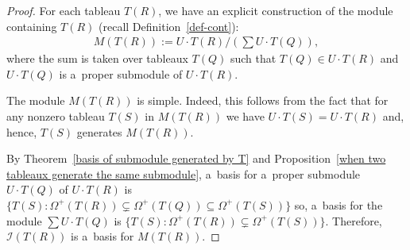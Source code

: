 \documentclass[11pt]{article}
\numberwithin{equation}{section}
\begin{document}
\begin{proof}

For each tableau $T(R)$, we have an explicit construction of the module containing $T(R)$ (recall
Def\/inition~\ref{def-cont}):
\begin{gather*}
M(T(R)):=U\cdot T(R)/\left(\sum U\cdot T(Q)\right),
\end{gather*}
where the sum is taken over tableaux $T(Q)$ such that $T(Q)\in U\cdot T(R)$ and $U\cdot T(Q)$ is a~proper submodule of
$U\cdot T(R)$.

The module $M(T(R))$ is simple.
Indeed, this follows from the fact that for any nonzero tableau $T(S)$ in $M(T(R))$ we have $U\cdot T(S)=U\cdot T(R)$
and, hence, $T(S)$ generates $M(T(R))$.

By Theorem~\ref{basis of submodule generated by T} and Proposition~\ref{when two tableaux generate the same submodule},
a~basis for a~proper submodule $U\cdot T(Q)$ of $U\cdot T(R)$ is
$\{T(S):\Omega^{+}(T(R))\subsetneq\Omega^{+}(T(Q))\subseteq \Omega^{+}(T(S))\}$ so, a~basis for the module $\sum U\cdot
T(Q)$ is $\{T(S):\Omega^{+}(T(R))\subsetneq\Omega^{+}(T(S))\}$.
Therefore, $\mathcal{I}(T(R))$ is a~basis for $M(T(R))$.
\setcounter{section}{6}
\setcounter{subsection}{2}
\setcounter{subsubsection}{0}
\setcounter{Theorem}{14}
\setcounter{equation}{3}
\end{proof}
\end{document}
